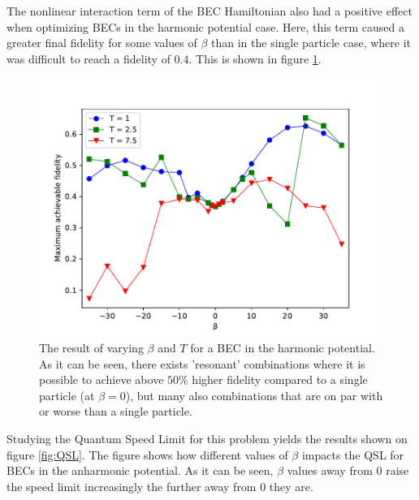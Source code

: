 \documentclass[aps,pra,reprint,superscriptaddress]{revtex4-1}
\begin{document}
The nonlinear interaction term of the BEC Hamiltonian also had a positive effect when optimizing BECs in the harmonic potential case. Here, this term caused a greater final fidelity for some values of $\beta$ than in the single particle case, where it was difficult to reach a fidelity of $0.4$. This is shown in figure \ref{fig:HO}.\\

\begin{figure}[h]
	\includegraphics[width=\columnwidth]{graphics/betaTHO.pdf}
	\caption{The result of varying $\beta$ and $T$ for a BEC in the harmonic potential. As it can be seen, there exists 'resonant' combinations where it is possible to achieve above $50\%$ higher fidelity compared to a single particle (at $\beta=0$), but many also combinations that are on par with or worse than a single particle.}
	\label{fig:HO}
\end{figure}

Studying the Quantum Speed Limit for this problem yields the results shown on figure \ref{fig:QSL}. The figure shows how different values of $\beta$ impacts the QSL for BECs in the anharmonic potential. As it can be seen, $\beta$ values away from 0 raise the speed limit increasingly the further away from 0 they are. \\
\end{document}
